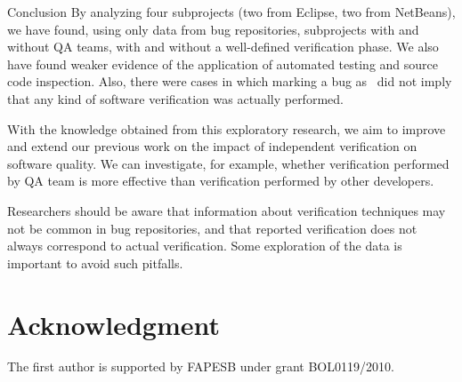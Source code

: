 \begin{section}{Conclusion} \label{sec:conclusion}
	By analyzing four subprojects (two from Eclipse, two from NetBeans), we have found, using only data from bug repositories, subprojects with and without QA teams, with and without a well-defined verification phase. We also have found weaker evidence of the application of automated testing and source code inspection. Also, there were cases in which marking a bug as \VERIFIED\ did not imply that any kind of software verification was actually performed.
			
	With the knowledge obtained from this exploratory research, we aim to improve and extend our previous work on the impact of independent verification on software quality. We can investigate, for example, whether verification performed by QA team is more effective than verification performed by other developers.
	
	Researchers should be aware that information about verification techniques may not be common in bug repositories, and that reported verification does not always correspond to actual verification. Some exploration of the data is important to avoid such pitfalls.
	
	
\end{section}

\section*{Acknowledgment}

The first author is supported by FAPESB under grant BOL0119/2010.
